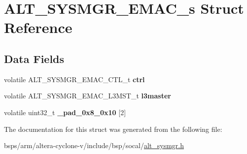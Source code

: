 \hypertarget{structALT__SYSMGR__EMAC__s}{}\section{A\+L\+T\+\_\+\+S\+Y\+S\+M\+G\+R\+\_\+\+E\+M\+A\+C\+\_\+s Struct Reference}
\label{structALT__SYSMGR__EMAC__s}
\subsection*{Data Fields}
\begin{DoxyCompactItemize}
\item 
\mbox{\label{structALT__SYSMGR__EMAC__s_ae5a965b286d162653568e5a08ca802b1}} 
volatile A\+L\+T\+\_\+\+S\+Y\+S\+M\+G\+R\+\_\+\+E\+M\+A\+C\+\_\+\+C\+T\+L\+\_\+t {\bfseries ctrl}
\item 
\mbox{\label{structALT__SYSMGR__EMAC__s_af7185788996a7ec2d5d226c110a90293}} 
volatile A\+L\+T\+\_\+\+S\+Y\+S\+M\+G\+R\+\_\+\+E\+M\+A\+C\+\_\+\+L3\+M\+S\+T\+\_\+t {\bfseries l3master}
\item 
\mbox{\label{structALT__SYSMGR__EMAC__s_afa01d9a83f3e0f246fe2d2c48221b3a6}} 
volatile uint32\+\_\+t {\bfseries \+\_\+pad\+\_\+0x8\+\_\+0x10} \mbox{[}2\mbox{]}
\end{DoxyCompactItemize}


The documentation for this struct was generated from the following file\+:\begin{DoxyCompactItemize}
\item 
bsps/arm/altera-\/cyclone-\/v/include/bsp/socal/\mbox{\hyperlink{alt__sysmgr_8h}{alt\+\_\+sysmgr.\+h}}\end{DoxyCompactItemize}
